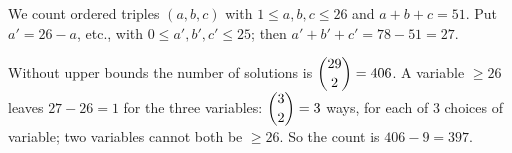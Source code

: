 We count ordered triples $(a,b,c)$ with $1\le a,b,c\le26$ and $a+b+c=51$. Put $a'=26-a$, etc., with $0\le a',b',c'\le25$; then $a'+b'+c'=78-51=27$.

Without upper bounds the number of solutions is $\dbinom{29}{2}=406$. A variable $\ge26$ leaves $27-26=1$ for the three variables: $\dbinom{3}{2}=3$ ways, for each of $3$ choices of variable; two variables cannot both be $\ge26$. So the count is $406-9=\boxed{397}$.
